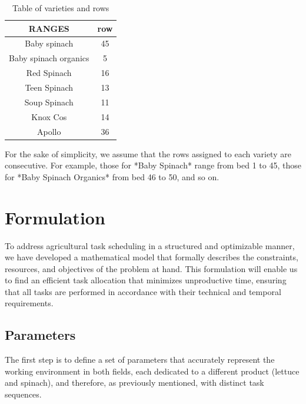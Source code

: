  \begin{table}[ht!]
    \centering
    \begin{minipage}{0.48\textwidth}
        \centering
        \begin{tabular}{|c|c|}
            \hline
            \rowcolor{gray!30} \textbf{\textcolor{grey3}{RANGES}} & \textbf{\textcolor{grey3}{row}}\\\hline
            \hline
            Baby spinach   & 45 \\ \hline
            Baby spinach organics   & 5\\ \hline
            Red Spinach             & 16\\ \hline
            Teen Spinach            & 13\\ \hline
            Soup Spinach & 11 \\ \hline
            Knox Cos     & 14 \\ \hline
            Apollo      & 36 \\             
            \hline
        \end{tabular}
        \caption{Table of varieties and rows}
        \label{tab:Variedades}
    \end{minipage}
    \hfill
\end{table}
For the sake of simplicity, we assume that the rows assigned to each variety are consecutive.  
For example, those for *Baby Spinach* range from bed 1 to 45, those for *Baby Spinach Organics* from bed 46 to 50, and so on.


\chapter*{Formulation}

To address agricultural task scheduling in a structured and optimizable manner, we have developed a mathematical model that formally describes the constraints, resources, and objectives of the problem at hand.  
This formulation will enable us to find an efficient task allocation that minimizes unproductive time, ensuring that all tasks are performed in accordance with their technical and temporal requirements.

\section*{Parameters}
The first step is to define a set of parameters that accurately represent the working environment in both fields, each dedicated to a different product (lettuce and spinach),  
and therefore, as previously mentioned, with distinct task sequences.


